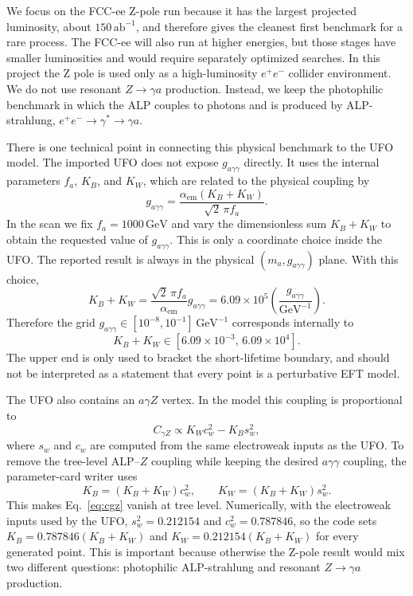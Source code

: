 \documentclass[12pt,a4paper]{article}
\begin{document}
We focus on the FCC-ee Z-pole run because it has the largest projected
luminosity, about $150\,\text{ab}^{-1}$, and therefore gives the cleanest first
benchmark for a rare process. The FCC-ee will also run at higher energies, but
those stages have smaller luminosities and would require separately optimized
searches. In this project the Z pole is used only as a high-luminosity
$e^+e^-$ collider environment. We do not use resonant $Z\to\gamma a$
production. Instead, we keep the photophilic benchmark in which the ALP couples
to photons and is produced by ALP-strahlung,
$e^+e^-\to\gamma^\ast\to\gamma a$.

There is one technical point in connecting this physical benchmark to the UFO
model. The imported UFO does not expose $g_{a\gamma\gamma}$ directly. It uses
the internal parameters $f_a$, $K_B$, and $K_W$, which are related to the
physical coupling by
\begin{equation}
    g_{a\gamma\gamma}=
    \frac{\alpha_\mathrm{em}(K_B+K_W)}
    {\sqrt{2}\,\pi f_a}.
    \label{eq:ufo_mapping}
\end{equation}
In the scan we fix $f_a=1000\,\text{GeV}$ and vary the dimensionless sum
$K_B+K_W$ to obtain the requested value of $g_{a\gamma\gamma}$. This is only a
coordinate choice inside the UFO. The reported result is always in the
physical $(m_{a},g_{a\gamma\gamma})$ plane. With this choice,
\begin{equation}
    K_B+K_W
    =
    \frac{\sqrt{2}\,\pi f_a}{\alpha_\mathrm{em}}g_{a\gamma\gamma}
    =
    6.09\times10^{5}
    \left(\frac{g_{a\gamma\gamma}}{\text{GeV}^{-1}}\right).
    \label{eq:k_sum_numeric}
\end{equation}
Therefore the grid
$g_{a\gamma\gamma}\in[10^{-8},10^{-1}]\,\text{GeV}^{-1}$ corresponds internally
to
\begin{equation}
    K_B+K_W\in[6.09\times10^{-3},\,6.09\times10^{4}].
    \label{eq:k_sum_range}
\end{equation}
The upper end is only used to bracket the short-lifetime boundary, and should
not be interpreted as a statement that every point is a perturbative EFT model.

The UFO also contains an $a\gamma Z$ vertex. In the model this coupling is
proportional to
\begin{equation}
    C_{\gamma Z}\propto K_W c_w^2-K_B s_w^2,
    \label{eq:cgz}
\end{equation}
where $s_w$ and $c_w$ are computed from the same electroweak inputs as the UFO.
To remove the tree-level ALP--$Z$ coupling while keeping the desired
$a\gamma\gamma$ coupling, the parameter-card writer uses
\begin{equation}
    K_B=(K_B+K_W)c_w^2,
    \qquad
    K_W=(K_B+K_W)s_w^2.
    \label{eq:photophilic_split}
\end{equation}
This makes Eq.~\eqref{eq:cgz} vanish at tree level. Numerically, with the
electroweak inputs used by the UFO, $s_w^2=0.212154$ and
$c_w^2=0.787846$, so the code sets
$K_B=0.787846(K_B+K_W)$ and $K_W=0.212154(K_B+K_W)$ for every generated point.
This is important because otherwise the Z-pole result would mix two different
questions: photophilic ALP-strahlung and resonant $Z\to\gamma a$ production.
\end{document}
